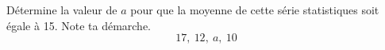 %
%
    Détermine la valeur de $a$ pour que la moyenne de cette série statistiques soit égale à 15. Note ta démarche.
    \[17,\ 12,\ a,\ 10\]
